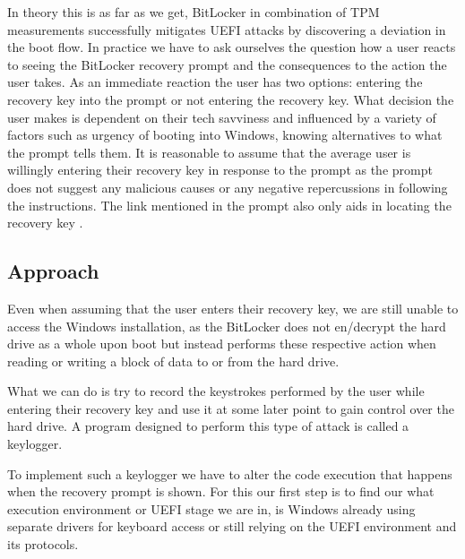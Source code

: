 In theory this is as far as we get, BitLocker in combination of \ac{TPM} measurements successfully mitigates \ac{UEFI} attacks by discovering a deviation in the boot flow.
In practice we have to ask ourselves the question how a user reacts to seeing the BitLocker recovery prompt and the consequences to the action the user takes. As an immediate reaction the user has two options: entering the recovery key into the prompt or not entering the recovery key.
What decision the user makes is dependent on their tech savviness and influenced by a variety of factors such as urgency of booting into Windows, knowing alternatives to what the prompt tells them.
It is reasonable to assume that the average user is willingly entering their recovery key in response to the prompt as the prompt does not suggest any malicious causes or any negative repercussions in following the instructions. The link mentioned in the prompt also only aids in locating the recovery key \cite{microsoft-recovery-key-faq}.



\subsection{Approach}

Even when assuming that the user enters their recovery key, we are still unable to access the Windows installation, as the BitLocker does not en/decrypt the hard drive as a whole upon boot but instead performs these respective action when reading or writing a block of data to or from the hard drive.

What we can do is try to record the keystrokes performed by the user while entering their recovery key and use it at some later point to gain control over the hard drive. A program designed to perform this type of attack is called a keylogger.

To implement such a keylogger we have to alter the code execution that happens when the recovery prompt is shown. For this our first step is to find our what execution environment or \ac{UEFI} stage we are in, is Windows already using separate drivers for keyboard access or still relying on the \ac{UEFI} environment and its protocols.

